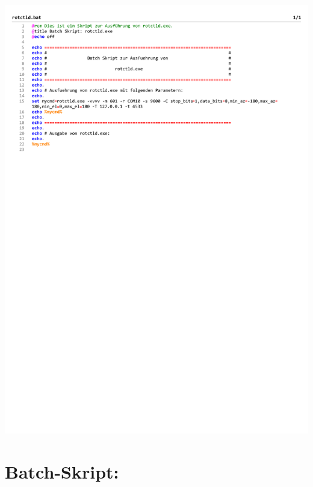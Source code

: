\begin{center}
	\includegraphics[width=1\textwidth]{./appendicies/rotctld}
\end{center}


\chapter{Batch-Skript: }
\label{chap:rotctlbat}


